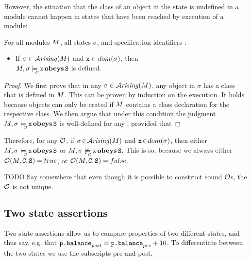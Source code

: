 {However, the situation that the class of an object in the state is undefined in a module cannot
happen  in states that have been reached by execution of a module:}

\begin{lemma}
For all modules $M$, all states $\sigma$, and specification identifiers :

\begin{itemize}
\item
{If $\sigma\in{\mathcal{A}}\textrm{\textit{rising}}(M)$  and ${\textrm{\ttfamily{x}}}\in dom (\sigma)$, then \\  $\M, \sigma \modelsWithO \prg{x} \obeys \prg{S}$ is defined.}\\
\end{itemize}
\end{lemma}
\begin{proof}
We first prove that in any $\sigma\in{\mathcal{A}}\textrm{\textit{rising}}(M)$,  any object in
$\sigma$ has a class that is defined in $M$. This can be proven
by induction on the execution. It holds because objects can only
be crated if $M$ contains a class declaration for the respective class.
We then argue that under this condition the judgment $\M, \sigma \modelsWithO \prg{x} \obeys \prg{S}$ is well-defined for any , provided that
  \end{proof}

{Therefore, for any ${\cal O}$, if $\sigma\!\in\!{\mathcal{A}}\textrm{\textit{rising}}(M)$  and ${\textrm{\ttfamily{x}}}\!\in\!dom (\sigma)$, then  either $\M, \sigma \modelsWithO \prg{x} \obeys \prg{S}$ or $\M, \sigma \not\modelsWithO \prg{x} \obeys \prg{S}$.
This is so, because we always either ${\cal O}(M,{\textrm{\ttfamily{C}}},{\textrm{\ttfamily{S}}})=true$, or  ${\cal O}(M,{\textrm{\ttfamily{C}}},{\textrm{\ttfamily{S}}})=false$.  }


{TODO Say somewhere that even though it is possible to construct sound ${\cal O}$s, the ${\cal O}$ is not unique.}

\subsection{Two state assertions} Two-state assertions allow us to compare properties of two different states, and thus say, e.g. that ${\textrm{\ttfamily{p.balance}}}_{{post}} = {\textrm{\ttfamily{p.balance}}}_{{pre}} + 10$. To differentiate between the two states we use the subscripts  \textsf{pre} and  \textsf{post}.

